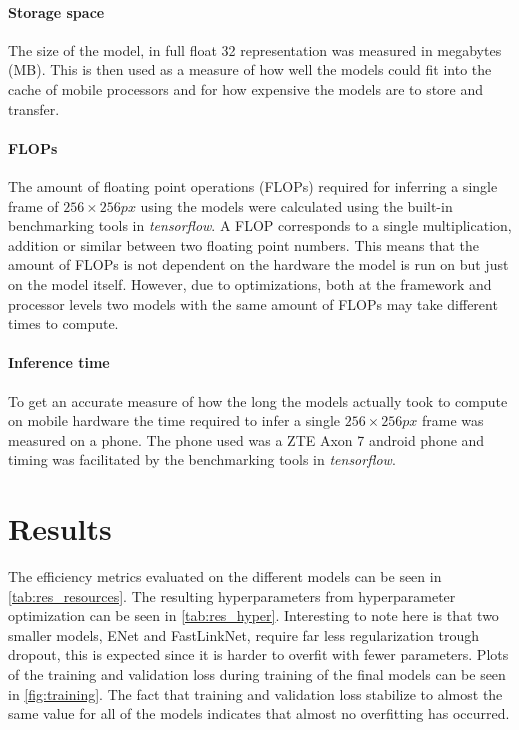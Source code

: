 \documentclass{kththesis}
\begin{document}
\subsubsection{Storage space}
The size of the model, in full float 32 representation was measured in megabytes
(MB). This is then used as a measure of how well the models could fit into the cache of mobile processors and for how expensive the models are to store and
transfer.

\subsubsection{FLOPs}
The amount of floating point operations (FLOPs) required for inferring a single frame
of \(256 \times 256 px\) using the models were calculated using the built-in benchmarking tools in
\textit{tensorflow}. A FLOP corresponds to a single multiplication, addition or
similar between two floating point numbers. This means that the amount of FLOPs is not
dependent on the hardware the model is run on but just on the model itself.
However, due to optimizations, both at the framework and processor levels two
models with the same amount of FLOPs may take different times to compute.

\subsubsection{Inference time}
To get an accurate measure of how the long the models actually took to compute on
mobile hardware the time required to infer a single \(256 \times 256 px\) frame
was measured on a phone. The phone used was a ZTE Axon 7 android phone and
timing was facilitated by the benchmarking tools in \textit{tensorflow}.

\chapter{Results}
The efficiency metrics evaluated on the different models can be seen in \cref{tab:res_resources}.
The resulting hyperparameters from hyperparameter optimization can be seen in
\cref{tab:res_hyper}. Interesting to note here is that two smaller models, ENet
and FastLinkNet, require far less regularization trough dropout, this is
expected since it is harder to overfit with fewer parameters.
Plots of the training and validation loss during training of the final models
can be seen in \cref{fig:training}. The fact that training and validation
loss stabilize to almost the same value for all of the models indicates that
almost no overfitting has occurred.
\end{document}
